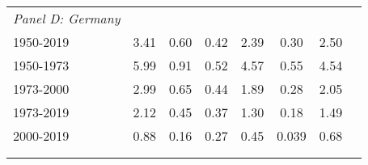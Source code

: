 \begin{tabular}{lccccccc}
\textit{Panel D: Germany} \\
1950-2019           &        3.41&        0.60&        0.42&        2.39&        0.30&        2.50\\
1950-1973           &        5.99&        0.91&        0.52&        4.57&        0.55&        4.54\\
1973-2000           &        2.99&        0.65&        0.44&        1.89&        0.28&        2.05\\
1973-2019           &        2.12&        0.45&        0.37&        1.30&        0.18&        1.49\\
2000-2019           &        0.88&        0.16&        0.27&        0.45&       0.039&        0.68\\
\\ 
\hline \\ 
\end{tabular}
